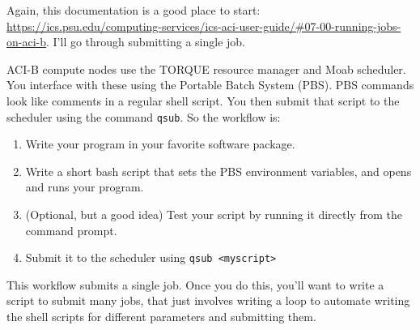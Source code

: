 \documentclass[twoside]{article}
\begin{document}
Again, this documentation is a good place to start: \url{https://ics.psu.edu/computing-services/ics-aci-user-guide/#07-00-running-jobs-on-aci-b}.  I'll go through submitting a single job. 

ACI-B compute nodes use the TORQUE resource manager and Moab scheduler. You interface with these using the Portable Batch System (PBS). PBS commands look like comments in a regular shell script. You then submit that script to the scheduler using the command {\tt qsub}.  So the workflow is: 

\begin{enumerate}
\item Write your program in your favorite software package. 
\item Write a short bash script that sets the PBS environment variables, and opens and runs your program. 
\item (Optional, but a good idea) Test your script by running it directly from the command prompt. 
\item Submit it to the scheduler using {\tt qsub <myscript>}
\end{enumerate}

This workflow submits a single job. Once you do this, you'll want to write a script to submit many jobs, that just involves writing a loop to automate writing the shell scripts for different parameters and submitting them. 
\end{document}
